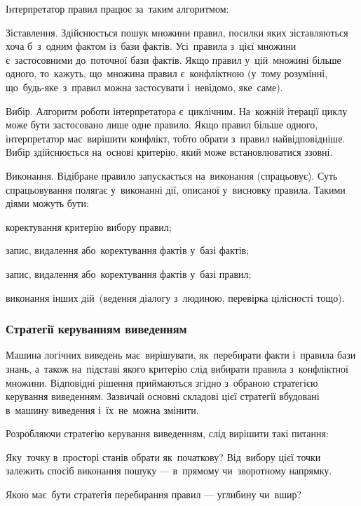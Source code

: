 \documentclass[
  a4paper,
  oneside,
  BCOR = 10mm,
  DIV = 12,
  12pt,
  headings = normal,
]{scrartcl}
\begin{document}
        Інтерпретатор правил працює за~таким алгоритмом:
        \begin{hangenumerate}
          \item Зіставлення. Здійснюється пошук множини правил, посилки яких зіставляються хоча б~з~одним фактом із~бази фактів. Усі~правила з~цієї множини є~застосовними до~поточної бази фактів. Якщо правил у~цій~множині більше одного, то~кажуть, що~множина правил є~конфліктною (у~тому розумінні, що~будь-яке~з~правил можна застосувати і~невідомо, яке~саме).
          \item Вибір. Алгоритм роботи інтерпретатора є~циклічним. На~кожній ітерації циклу може бути застосовано лише одне правило. Якщо правил більше одного, інтерпретатор має~вирішити конфлікт, тобто обрати з~правил найвідповідніше. Вибір здійснюється на~основі критерію, який може встановлюватися ззовні.
          \item Виконання. Відібране правило запускається на~виконання (спрацьовує). Суть спрацьовування полягає у~виконанні дії, описаної у~висновку правила. Такими діями можуть бути:
            \begin{hangitemize}
              \item коректування критерію вибору правил;
              \item запис, видалення або~коректування фактів у~базі фактів;
              \item запис, видалення або~коректування фактів у~базі правил;
              \item виконання інших дій~(ведення діалогу з~людиною, перевірка цілісності тощо).
            \end{hangitemize}
        \end{hangenumerate}

      \subsubsection{Стратегії керуванням виведенням}
        Машина логічних виведень має~вирішувати, як~перебирати факти і~правила бази знань, а~також на~підставі якого критерію слід вибирати правила з~конфліктної множини. Відповідні рішення приймаються згідно з~обраною стратегією керування виведенням. Зазвичай основні складові цієї стратегії вбудовані в~машину виведення і~їх~не~можна змінити.

        Розробляючи стратегію керування виведенням, слід вирішити такі питання:
        \begin{hangitemize}
          \item Яку~точку в~просторі станів обрати як~початкову? Від~вибору цієї точки залежить спосіб виконання пошуку — в~прямому чи~зворотному напрямку.
          \item Якою має~бути стратегія перебирання правил — углибину чи~вшир?
        \end{hangitemize}
\end{document}
